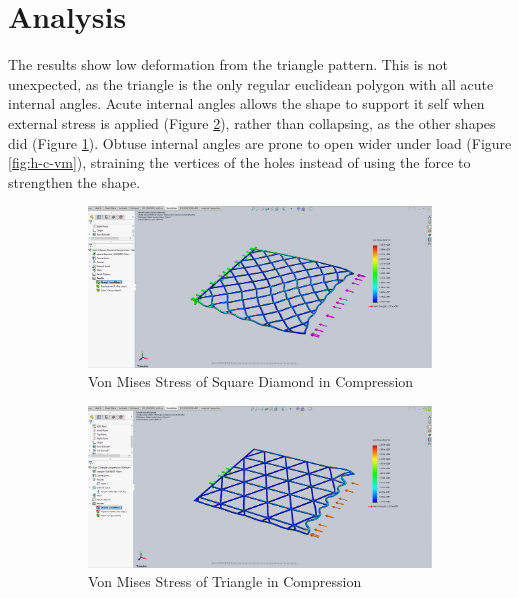 \documentclass[12pt, letterpaper]{article}
\begin{document}
\section{Analysis}
\label{sec:analysis}

The results show low deformation from the triangle pattern. This is not unexpected, as the triangle is the only regular euclidean polygon with all acute internal angles. Acute internal angles allows the shape to support it self when external stress is applied (Figure \ref{fig:t-c-vm}), rather than collapsing, as the other shapes did (Figure \ref{fig:sd-c-vm}). Obtuse internal angles are prone to open wider under load (Figure \ref{fig:h-c-vm}), straining the vertices of the holes instead of using the force to strengthen the shape. 

\begin{figure}[H]
	\centering
	\caption{Graphs}
	\label{fig:imgs}
	\begin{subfigure}[b]{0.8\linewidth}
		\includegraphics[width=0.8\linewidth]{./graphs/compression/square-diamond-compression-stress}
		\caption{Von Mises Stress of Square Diamond in Compression}
		\label{fig:sd-c-vm}
	\end{subfigure}
	\begin{subfigure}[b]{0.8\linewidth}
		\includegraphics[width=0.8\linewidth]{./graphs/compression/triangle-compression-stress}
		\caption{Von Mises Stress of Triangle in Compression}
		\label{fig:t-c-vm}
	\end{subfigure}
	\begin{subfigure}[b]{0.8\linewidth}

\end{subfigure}
\end{figure}
\end{document}
